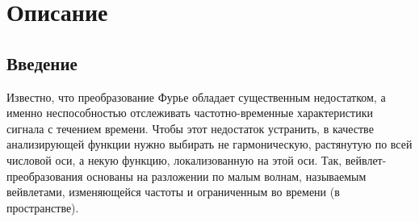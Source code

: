 \documentclass[12pt]{article}
\begin{document}
\section*{Описание}
\subsection*{Введение}
Известно, что преобразование Фурье обладает существенным недостатком, а именно неспособностью отслеживать частотно-временные характеристики сигнала с течением времени. Чтобы этот недостаток устранить, в качестве анализирующей функции нужно выбирать не гармоническую, растянутую по всей числовой оси, а некую функцию, локализованную на этой оси. Так, вейвлет-преобразования  основаны на разложении по малым волнам,
называемым вейвлетами, изменяющейся частоты и ограниченным во времени (в пространстве).
\end{document}
